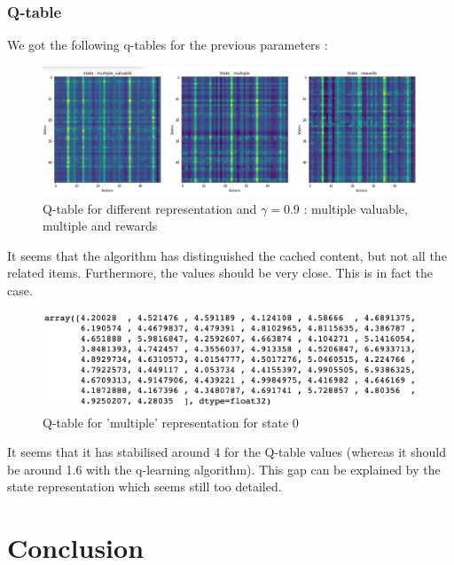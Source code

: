 \documentclass[a4paper]{article}
\begin{document}
    \subsubsection{Q-table}
    We got the following q-tables for the previous parameters : 
    
     \begin{figure}[h!]
            \centering
            \includegraphics[scale = 0.4]{img/q_tables_20000.png}
            \caption{Q-table for different representation and $\gamma = 0.9$ : multiple valuable, multiple and rewards}
            \label{fig:my_label}
        \end{figure}
    
    It seems that the algorithm has distinguished the cached content, but not all the related items. Furthermore, the values should be very close. This is in fact the case. 
    \newpage
     \begin{figure}[h!]
            \centering
            \includegraphics[scale = 0.4]{img/q_table_0.png}
            \caption{Q-table for 'multiple' representation for state 0}
            \label{fig:my_label}
        \end{figure}
    
    It seems that it has stabilised around 4 for the Q-table values (whereas it should be around 1.6 with the q-learning algorithm). This gap can be explained by the state representation which seems still too detailed. 


\section{Conclusion}
\end{document}
